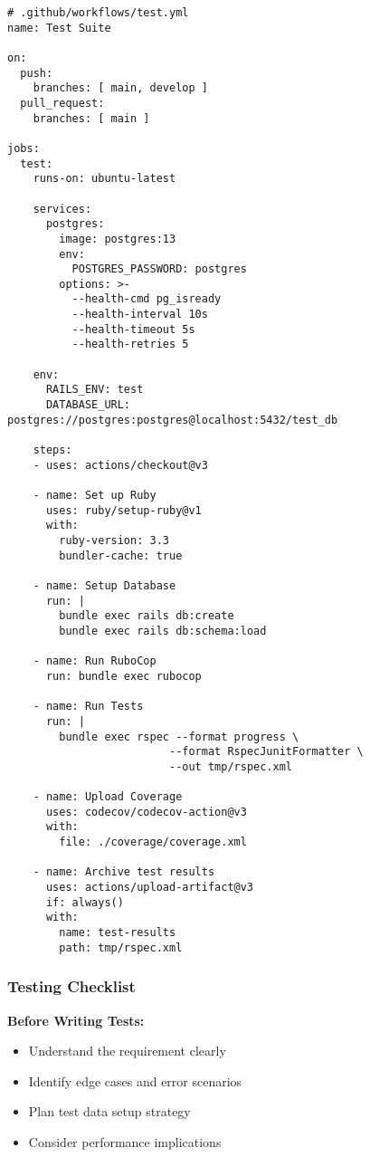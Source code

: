 \documentclass[12pt,a4paper]{article}
\begin{document}
\begin{lstlisting}
# .github/workflows/test.yml
name: Test Suite

on:
  push:
    branches: [ main, develop ]
  pull_request:
    branches: [ main ]

jobs:
  test:
    runs-on: ubuntu-latest
    
    services:
      postgres:
        image: postgres:13
        env:
          POSTGRES_PASSWORD: postgres
        options: >-
          --health-cmd pg_isready
          --health-interval 10s
          --health-timeout 5s
          --health-retries 5

    env:
      RAILS_ENV: test
      DATABASE_URL: postgres://postgres:postgres@localhost:5432/test_db

    steps:
    - uses: actions/checkout@v3
    
    - name: Set up Ruby
      uses: ruby/setup-ruby@v1
      with:
        ruby-version: 3.3
        bundler-cache: true

    - name: Setup Database
      run: |
        bundle exec rails db:create
        bundle exec rails db:schema:load

    - name: Run RuboCop
      run: bundle exec rubocop

    - name: Run Tests
      run: |
        bundle exec rspec --format progress \
                         --format RspecJunitFormatter \
                         --out tmp/rspec.xml

    - name: Upload Coverage
      uses: codecov/codecov-action@v3
      with:
        file: ./coverage/coverage.xml

    - name: Archive test results
      uses: actions/upload-artifact@v3
      if: always()
      with:
        name: test-results
        path: tmp/rspec.xml
\end{lstlisting}

\subsubsection{Testing Checklist}

\textbf{Before Writing Tests:}
\begin{itemize}
    \item Understand the requirement clearly
    \item Identify edge cases and error scenarios
    \item Plan test data setup strategy
    \item Consider performance implications
\end{itemize}
\end{document}
